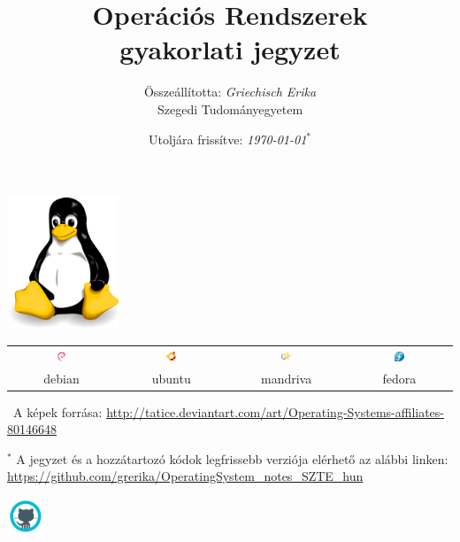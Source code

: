 \documentclass[a4paper]{article}
\author{Összeállította: \textit{Griechisch Erika}\\Szegedi Tudományegyetem}
\title{{\Huge \sc Operációs Rendszerek}\\ \huge gyakorlati jegyzet}
\date{\small Utoljára frissítve: \textit{\today}$^*$}
\begin{document}
{}
\vspace{30mm}
\maketitle
\thispagestyle{empty}
\vspace{30mm}


\begin{center}
\includegraphics[width=0.25\textwidth]{pics/Linux_Logo}

\vspace{10mm}

\begin{tabular}{cccc}
	\includegraphics[width=0.1\textwidth]{pics/Debian}
	&
	\includegraphics[width=0.1\textwidth]{pics/Ubuntu}
	&
	\includegraphics[width=0.1\textwidth]{pics/Mandriva}
	&
	\includegraphics[width=0.1\textwidth]{pics/Fedora}
	  \\
	  debian	& ubuntu & mandriva & fedora	
  \end{tabular}

\small \ccLogo\ A képek forrása: \url{http://tatice.deviantart.com/art/Operating-Systems-affiliates-80146648}
\end{center}


\vfill 

\begin{center}
$^*$ A jegyzet és a hozzátartozó kódok legfrissebb verziója elérhető az alábbi linken: \url{https://github.com/grerika/OperatingSystem_notes_SZTE_hun}

\includegraphics[width=3em]{pics/icons8-github}
\end{center}
\end{document}
